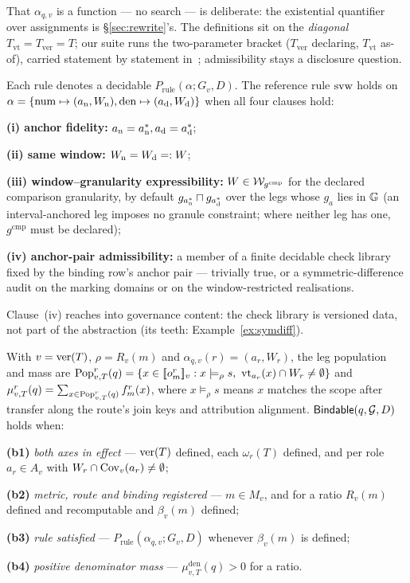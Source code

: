  That $\alpha_{q,v}$ is a function --- no search --- is deliberate: the
existential quantifier over assignments is \S\ref{sec:rewrite}'s. The
definitions sit on the \emph{diagonal} $T_{\mathrm{vt}}=T_{\mathrm{ver}}=T$;
our suite runs the two-parameter bracket ($T_{\mathrm{ver}}$ declaring,
$T_{\mathrm{vt}}$ as-of), carried statement by statement
in~\cite{asofgov-tr}; admissibility stays a disclosure question.

\begin{definition}
\label{def:rule}
 Each rule denotes a decidable $P_{\mathrm{rule}}(\alpha;G_v,D)$. The reference
rule $\mathrm{svw}$ holds on
$\alpha=\{\mathrm{num}\mapsto(a_{\mathrm{n}},W_{\mathrm{n}}),\mathrm{den}\mapsto(a_{\mathrm{d}},W_{\mathrm{d}})\}$
when all four clauses hold:
\par\noindent\textbf{(i) anchor fidelity:}
$a_{\mathrm{n}}=a^*_{\mathrm{n}},a_{\mathrm{d}}=a^*_{\mathrm{d}}$;
\par\noindent\textbf{(ii) same window:} $W_{\mathrm{n}}=W_{\mathrm{d}}=:W$;
\par\noindent\textbf{(iii) window--granularity expressibility:}
$W\in\mathcal{W}_{g^{\mathrm{cmp}}}$ for the declared comparison granularity, by
default $g_{a^*_{\mathrm{n}}}\sqcap g_{a^*_{\mathrm{d}}}$ over the legs whose $g_a$ lies in
$\mathbb{G}$ (an interval-anchored leg imposes no granule constraint; where neither
leg has one, $g^{\mathrm{cmp}}$ must be declared);
\par\noindent\textbf{(iv) anchor-pair admissibility:} a member of a finite
decidable check library fixed by the binding row's anchor pair --- trivially
true, or a symmetric-difference audit on the marking domains or on the
window-restricted realisations.
\end{definition}

 Clause~(iv) reaches into governance content: the check
library is versioned data, not part of the abstraction (its teeth:
Example~\ref{ex:symdiff}).

\begin{definition}[bindability]
\label{def:bindable}
 With $v=\mathrm{ver}(T)$, $\rho=R_v(m)$ and $\alpha_{q,v}(r)=(a_r,W_r)$, the leg
population and mass are
$\mathrm{Pop}^{r}_{v,T}(q)=\{x\in[\![o^{r}_m]\!]_v: x\models_\rho s,\allowbreak\
\mathrm{vt}_{a_r}(x)\cap W_r\neq\emptyset\}$ and
$\mu^{r}_{v,T}(q)=\sum_{x\in\mathrm{Pop}^{r}_{v,T}(q)}f^{r}_m(x)$, where
$x\models_\rho s$ means $x$ matches the scope after transfer along the route's
join keys and attribution alignment. $\mathsf{Bindable}(q,\mathcal{G},D)$ holds when:
\par\noindent\textbf{(b1)} \emph{both axes in effect} --- $\mathrm{ver}(T)$ defined,
each $\omega_r(T)$ defined, and per role $a_r\in A_v$ with
$W_r\cap\mathrm{Cov}_v(a_r)\neq\emptyset$;
\par\noindent\textbf{(b2)} \emph{metric, route and binding registered} ---
$m\in M_v$, and for a ratio $R_v(m)$ defined and recomputable and
$\beta_v(m)$ defined;
\par\noindent\textbf{(b3)} \emph{rule satisfied} ---
$P_{\mathrm{rule}}(\alpha_{q,v};G_v,D)$ whenever $\beta_v(m)$ is defined;
\par\noindent\textbf{(b4)} \emph{positive denominator mass} ---
$\mu^{\mathrm{den}}_{v,T}(q)>0$ for a ratio.
\end{definition}

